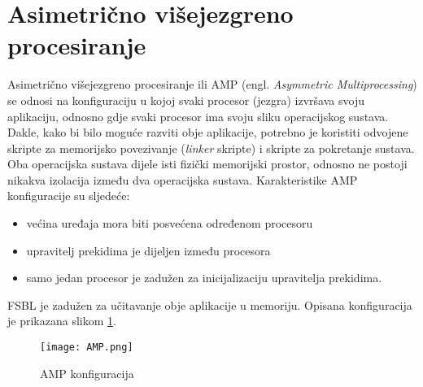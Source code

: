 \documentclass[times, utf8, diplomski, numeric]{fer}
\begin{document}
\section{Asimetrično višejezgreno procesiranje}
Asimetrično višejezgreno procesiranje ili AMP (engl. \textit{Asymmetric Multiprocessing}) se odnosi na
konfiguraciju u kojoj svaki procesor (jezgra) izvršava svoju aplikaciju, odnosno gdje svaki procesor ima
svoju sliku operacijskog sustava. Dakle, kako bi bilo moguće razviti obje aplikacije, potrebno je koristiti
odvojene skripte za memorijsko povezivanje (\textit{linker} skripte) i skripte za pokretanje sustava. Oba
operacijska sustava dijele isti fizički memorijski prostor, odnosno ne postoji nikakva izolacija između dva
operacijska sustava. Karakteristike AMP konfiguracije su sljedeće:
\begin{itemize}
  \item{većina uređaja mora biti posvećena određenom procesoru}
  \item{upravitelj prekidima je dijeljen između procesora}
  \item{samo jedan procesor je zadužen za inicijalizaciju upravitelja prekidima.}
\end{itemize}
FSBL je zadužen za učitavanje obje aplikacije u memoriju. Opisana konfiguracija je prikazana slikom \ref{amp}.

\begin{figure}[H]
  \centering
	\texttt{[image: AMP.png]}%
	\caption{AMP konfiguracija}
	\label{amp}%
\end{figure}
\end{document}
